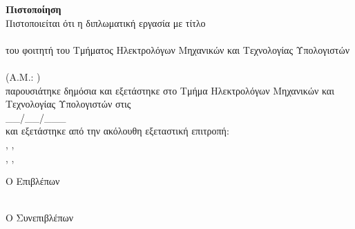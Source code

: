 \pagestyle{empty}
\begin{center}
  {\LARGE \textbf{Πιστοποίηση}\\[1cm]}
  \large Πιστοποιείται ότι η διπλωματική εργασία με τίτλο\\[1cm]
  \textbf{\large \doctitle }\\[1cm]
  του φοιτητή του Τμήματος Ηλεκτρολόγων Μηχανικών και Τεχνολογίας Υπολογιστών\\[1cm]
  \me \\[0.5cm]
  (Α.Μ.: \studnum )\\[1cm]
  παρουσιάτηκε δημόσια και εξετάστηκε στο Tμήμα  Ηλεκτρολόγων Μηχανικών και Τεχνολογίας Υπολογιστών στις\\[1cm]
  \Large{\_\_/\_\_/\_\_\_}\\[0.5cm]
  και εξετάστηκε από την ακόλουθη εξεταστική επιτροπή:\\[0.5cm]
  \supname, \suptitle, \supdep\\[0.5cm]
  \cosupname, \cosuptitle, \cosupdep\\
\end{center}
\vfill
\begin{minipage}{0.5\textwidth}
  \begin{flushleft} \large
    Ο Επιβλέπων\\[1cm]
    \supname \\
    \emph{\suptitle}
  \end{flushleft}
\end{minipage}
\begin{minipage}{0.5\textwidth}
  \begin{flushright} \large
    Ο Συνεπιβλέπων\\[1cm]
    \cosupname\\
    \emph{\cosuptitle}
  \end{flushright}
\end{minipage}
